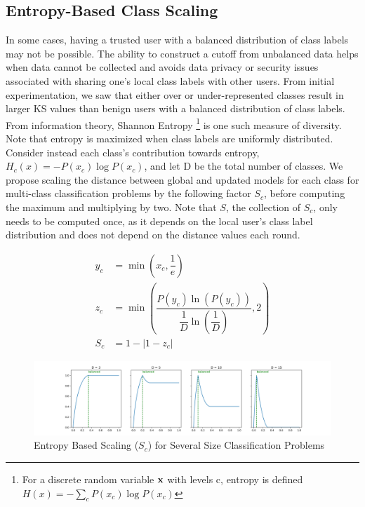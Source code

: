 \documentclass{article} %
\begin{document}
%
\subsection{Entropy-Based Class Scaling}

In some cases, having a trusted user with a balanced distribution of class labels may not be possible. The ability to construct a cutoff from unbalanced data helps when data cannot be collected and avoids data privacy or security issues associated with sharing one's local class labels with other users. From initial experimentation, we saw that either over or under-represented classes result in larger KS values than benign users with a balanced distribution of class labels. From information theory, Shannon Entropy \footnote{For a discrete random variable ${\mathbf{x}}$ with levels c, entropy is defined $H(x) = - \sum_c P(x_c) \log P(x_c)$} is one such measure of diversity. Note that entropy is maximized when class labels are uniformly distributed. Consider instead each class's contribution towards entropy, $H_c(x) = - P(x_c) \log P(x_c)$, and let D be the total number of classes. We propose scaling the distance between global and updated models for each class for multi-class classification problems by the following factor $S_c$, before computing the maximum and multiplying by two. Note that $S$, the collection of $S_c$, only needs to be computed once, as it depends on the local user's class label distribution and does not depend on the distance values each round.

\begin{align}
    y_c &= \min \left( x_c, \dfrac{1}{e} \right) \\
    z_c &= \min \left( \dfrac{P(y_c) \ln \left( P(y_c) \right)}{\dfrac{1}{D} \ln \left( \dfrac{1}{D} \right)}, 2 \right) \\
    S_c &= 1 - | 1 - z_c |    
\end{align}

\begin{figure}[H]
    \centering
    \includegraphics[width=\textwidth]{99_article/99_visuals/scaling.png}
    \caption{Entropy Based Scaling ($S_c$) for Several Size Classification Problems}
    \label{fig:scaling}
\end{figure}
\end{document}
